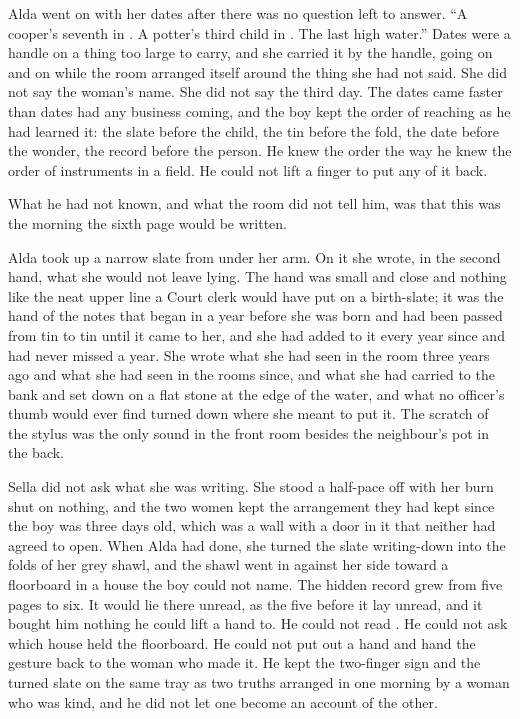 Alda went on with her dates after there was no question left to answer. “A cooper's seventh in . A potter's third child in . The last high water.” Dates were a handle on a thing too large to carry, and she carried it by the handle, going on and on while the room arranged itself around the thing she had not said. She did not say the woman's name. She did not say the third day. The dates came faster than dates had any business coming, and the boy kept the order of reaching as he had learned it: the slate before the child, the tin before the fold, the date before the wonder, the record before the person. He knew the order the way he knew the order of instruments in a field. He could not lift a finger to put any of it back.

What he had not known, and what the room did not tell him, was that this was the morning the sixth page would be written.

Alda took up a narrow slate from under her arm. On it she wrote, in the second hand, what she would not leave lying. The hand was small and close and nothing like the neat upper line a Court clerk would have put on a birth-slate; it was the hand of the notes that began in a year before she was born and had been passed from tin to tin until it came to her, and she had added to it every year since and had never missed a year. She wrote what she had seen in the room three years ago and what she had seen in the rooms since, and what she had carried to the bank and set down on a flat stone at the edge of the water, and what no officer's thumb would ever find turned down where she meant to put it. The scratch of the stylus was the only sound in the front room besides the neighbour's pot in the back.

Sella did not ask what she was writing. She stood a half-pace off with her burn shut on nothing, and the two women kept the arrangement they had kept since the boy was three days old, which was a wall with a door in it that neither had agreed to open. When Alda had done, she turned the slate writing-down into the folds of her grey shawl, and the shawl went in against her side toward a floorboard in a house the boy could not name. The hidden record grew from five pages to six. It would lie there unread, as the five before it lay unread, and it bought him nothing he could lift a hand to. He could not read . He could not ask which house held the floorboard. He could not put out a hand and hand the gesture back to the woman who made it. He kept the two-finger sign and the turned slate on the same tray as two truths arranged in one morning by a woman who was kind, and he did not let one become an account of the other.

